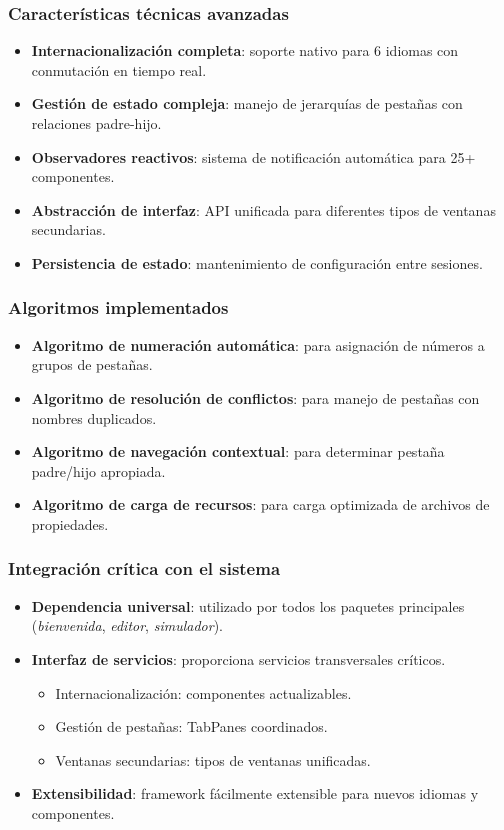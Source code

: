 \subsubsection{Características técnicas avanzadas}

\begin{itemize}
    \item \textbf{Internacionalización completa}: soporte nativo para 6 idiomas con conmutación en tiempo real.
    \item \textbf{Gestión de estado compleja}: manejo de jerarquías de pestañas con relaciones padre-hijo.
    \item \textbf{Observadores reactivos}: sistema de notificación automática para 25+ componentes.
    \item \textbf{Abstracción de interfaz}: API unificada para diferentes tipos de ventanas secundarias.
    \item \textbf{Persistencia de estado}: mantenimiento de configuración entre sesiones.
\end{itemize}

\subsubsection{Algoritmos implementados}

\begin{itemize}
    \item \textbf{Algoritmo de numeración automática}: para asignación de números a grupos de pestañas.
    \item \textbf{Algoritmo de resolución de conflictos}: para manejo de pestañas con nombres duplicados.
    \item \textbf{Algoritmo de navegación contextual}: para determinar pestaña padre/hijo apropiada.
    \item \textbf{Algoritmo de carga de recursos}: para carga optimizada de archivos de propiedades.
\end{itemize}

\subsubsection{Integración crítica con el sistema}

\begin{itemize}
    \item \textbf{Dependencia universal}: utilizado por todos los paquetes principales (\textit{bienvenida}, \textit{editor}, \textit{simulador}).
    \item \textbf{Interfaz de servicios}: proporciona servicios transversales críticos.
    \begin{itemize}
        \item Internacionalización: componentes actualizables.
        \item Gestión de pestañas: TabPanes coordinados.
        \item Ventanas secundarias: tipos de ventanas unificadas.
    \end{itemize}
    \item \textbf{Extensibilidad}: framework fácilmente extensible para nuevos idiomas y componentes.
\end{itemize}


